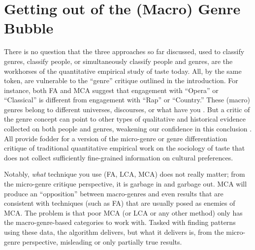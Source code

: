 \section{Getting out of the (Macro) Genre Bubble}
There is no question that the three approaches so far discussed, used to classify genres, classify people, or simultaneously classify people and genres, are the workhorses of the quantitative empirical study of taste today. All, by the same token, are vulnerable to the ``genre'' critique outlined in the introduction. For instance, both FA and MCA suggest that engagement with ``Opera'' or ``Classical'' is different from engagement with ``Rap'' or ``Country.'' These (macro) genres belong to different universes, discourses, or what have you \citep{vaneijck01}. But a critic of the genre concept can point to other types of qualitative and historical evidence collected on both people and genres, weakening our confidence in this conclusion \citep{lena2015relational}. All provide fodder for a version of the micro-genre or genre differentiation critique of traditional quantitative empirical work on the sociology of taste that does not collect sufficiently fine-grained information on cultural preferences. 

Notably, {\em what} technique you use (FA, LCA, MCA) does not really matter; from the micro-genre critique perspective, it is garbage in and garbage out. MCA will produce an ``opposition'' between macro-genres and even results that are consistent with techniques (such as FA) that are usually posed as enemies of MCA. The problem is that poor MCA (or LCA or any other method) only has the macro-genre-based categories to work with. Tasked with finding patterns using these data, the algorithm delivers, but what it delivers is, from the micro-genre perspective, misleading or only partially true results. 